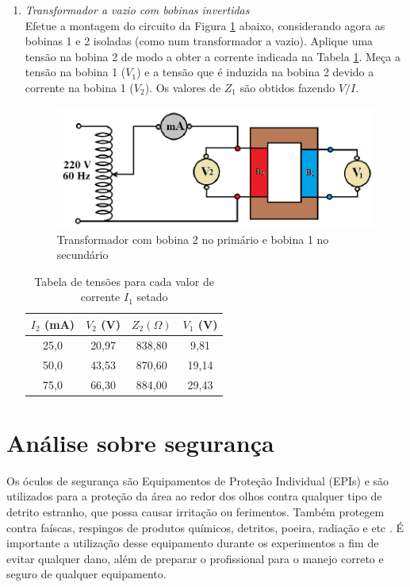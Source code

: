 \documentclass[a4paper,12pt,oneside,openany,table,xcdraw]{article}
\begin{document}
\begin{enumerate}[1)]
\item \emph{Transformador a vazio com bobinas invertidas}\\
Efetue a montagem do circuito da Figura \ref{2.6} abaixo, considerando agora as bobinas 1 e 2
isoladas (como num transformador a vazio). Aplique uma tensão na bobina 2 de modo a
obter a corrente indicada na Tabela \ref{tab4}. Meça a tensão na bobina 1 ($V_1$) e a tensão que é
induzida na bobina 2 devido a corrente na bobina 1 ($V_2$). Os valores de $Z_1$ são obtidos fazendo $V/I$.

\begin{figure}[h]
\centering
\captionsetup{font=scriptsize}
\includegraphics[width=11cm]{fig5}
\caption{Transformador com bobina 2 no primário e bobina 1 no secundário}
\label{2.6}
\end{figure}

\begin{table}[h]
\centering
\def\arraystretch{1.35}
\captionsetup{type=table, font=scriptsize}
\caption{Tabela de tensões para cada valor de corrente $I_1$ setado} \label{tab4}
\begin{tabular}{|c|c|c|c|}
\hline
$I_2$ (mA) & $V_2$ (V)  & $Z_{2} (\Omega)$ & $V_1$ (V) \\ \hline
25,0          & 20,97  &  838,80       &  9,81     \\ \hline
50,0          & 43,53  &  870,60       &  19,14   \\ \hline
75,0          & 66,30  &  884,00       &  29,43   \\ \hline
\end{tabular}
\end{table}



\end{enumerate}

\section{Análise sobre segurança} %
Os óculos de segurança são Equipamentos de Proteção Individual (EPIs) e são utilizados para a proteção da área ao redor dos olhos contra qualquer tipo de detrito estranho, que possa causar irritação ou ferimentos. Também protegem contra faíscas, respingos de produtos químicos, detritos, poeira, radiação e etc \cite{safe}.
É importante a utilização desse equipamento durante os experimentos a fim de evitar qualquer dano, além de preparar o profissional para o manejo correto e seguro de qualquer equipamento.
\end{document}

